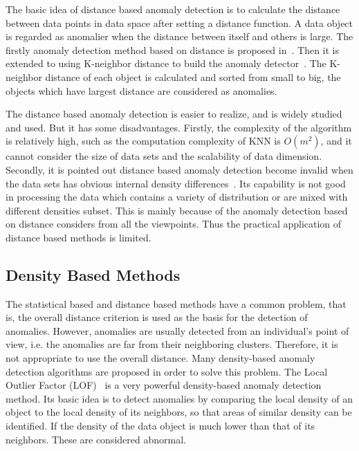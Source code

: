 The basic idea of distance based anomaly detection
is to calculate the distance between data points in
data space after setting a distance function.
A data object is regarded as anomalier when
the distance between  itself and others is large.
The firstly anomaly detection method
based on distance is proposed in~\cite{knorr1997unified}.
Then it is extended to using K-neighbor distance to
build the anomaly detector~\cite{ramaswamy2000efficient,kuang2008anomaly}.
The K-neighbor distance of each object is calculated and
sorted from small to big,
the objects which have largest
distance are considered as anomalies.

The distance based anomaly detection
is easier to realize,
and is widely studied and used.
But it has some disadvantages.
Firstly,
the complexity of the algorithm is relatively high,
such as the computation complexity of KNN is $O(m^2)$,
and it cannot consider the size of
data sets and the scalability of data dimension.
Secondly,
it is pointed out distance based anomaly detection become invalid when
the data sets has obvious internal density
differences~\cite{breunig2000lof}.
Its capability is not good in processing the data which
contains a variety of distribution or
are mixed with different densities subset.
This is mainly because of the anomaly detection based on
distance considers from all the viewpoints.
Thus the practical application  of distance based methods is limited.

\subsection{Density Based Methods}

The statistical based and distance based methods have a common problem,
that is,
the overall distance criterion is used as the basis for the detection of anomalies.
However,
anomalies are usually detected from an individual's point of view,
i.e.
the anomalies are far from their neighboring clusters.
Therefore,
it is not appropriate to use the overall distance.
Many density-based anomaly detection algorithms are proposed
in order to solve this problem.
The Local Outlier Factor (LOF)~\cite{breunig2000lof}
is a very powerful density-based anomaly detection method.
Its basic idea is to detect anomalies by comparing the local density of an object to the local density of its neighbors,
so that areas of similar density can be identified.
If the density of the data object is
much lower than that of its neighbors.
These are considered abnormal.

